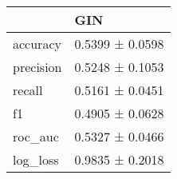 \begin{tabular}{ll}
\toprule
 & GIN \\
\midrule
accuracy & 0.5399 ± 0.0598 \\
precision & 0.5248 ± 0.1053 \\
recall & 0.5161 ± 0.0451 \\
f1 & 0.4905 ± 0.0628 \\
roc_auc & 0.5327 ± 0.0466 \\
log_loss & 0.9835 ± 0.2018 \\
\bottomrule
\end{tabular}
